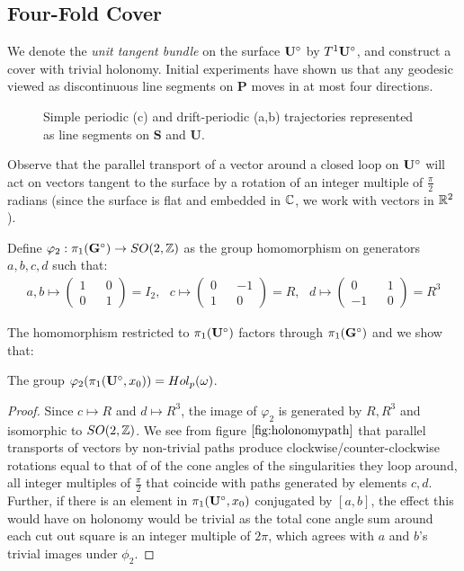 \documentclass[]{article}
\begin{document}
\subsection{Four-Fold Cover}
We denote the \emph{unit tangent bundle} on the surface $\mathbf{U}^\circ$ by $T^1\mathbf{U}^\circ$, and construct a cover with trivial holonomy. Initial experiments have shown us that any geodesic viewed as discontinuous line segments on $\mathbf{P}$ moves in at most four directions.
\begin{figure}[H]
\centering


\caption{Simple periodic (c) and drift-periodic (a,b) trajectories represented as line segments on $\mathbf{S}$ and $\mathbf{U}$.}
\label{fig:holonomypath}
\end{figure}
Observe that the parallel transport of a vector around a closed loop on $\mathbf{U}^\circ$ will act on vectors tangent to the surface by a rotation of an integer multiple of $\frac{\pi}{2}$ radians (since the surface is flat and embedded in $\mathbb{C}$, we work with vectors in $\mathbb{R}^2$).



\begin{Def}
Define $\varphi_2:\pi_1(\mathbf{G}^\circ)\rightarrow SO(2,\mathbb{Z})$ as the group homomorphism on generators $a,b,c,d$ such that:
\begin{align*}
a,b\mapsto \begin{pmatrix}1 && 0 \\ 0 && 1\end{pmatrix}=I_2,~~~
c\mapsto \begin{pmatrix}0 && -1 \\ 1 && 0\end{pmatrix}=R,~~~
d\mapsto \begin{pmatrix}0 && 1 \\ -1 && 0\end{pmatrix}=R^3
\end{align*}
\end{Def}
The homomorphism restricted to $\pi_1(\mathbf{U}^\circ)$ factors through $\pi_1(\mathbf{G}^\circ)$ and we show that:
\begin{lem}
The group $\varphi_2(\pi_1(\mathbf{U}^\circ,x_0))=Hol_p(\omega)$.
\begin{proof}
Since $c\mapsto R$ and $d\mapsto R^3$, the image of $\varphi_2$ is generated by $R,R^3$ and isomorphic to $SO(2,\mathbb{Z})$. We see from figure $\ref{fig:holonomypath}$ that parallel transports of vectors by non-trivial paths produce clockwise/counter-clockwise rotations equal to that of of the cone angles of the singularities they loop around, all integer multiples of $\frac{\pi}{2}$ that coincide with paths generated by elements $c,d$. Further, if there is an element in $\pi_1(\mathbf{U}^\circ,x_0)$ conjugated by $[a,b]$, the effect this would have on holonomy would be trivial as the total cone angle sum around each cut out square is an integer multiple of $2\pi$, which agrees with $a$ and $b$'s trivial images under $\phi_2$.
\end{proof}
\end{lem}
\end{document}
